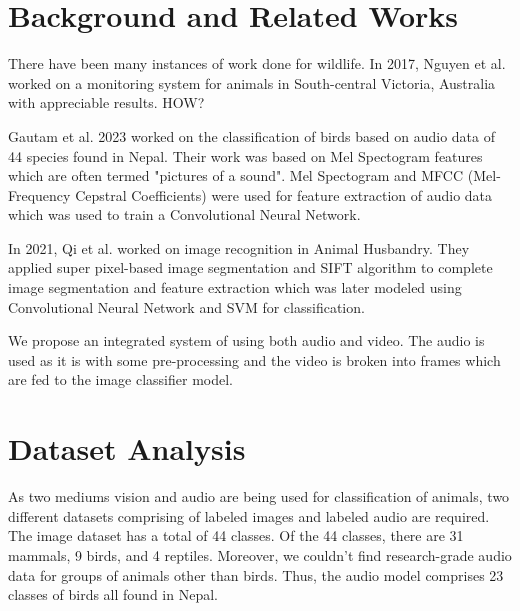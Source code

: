 \documentclass[fleqn, 10pt, twoside]{IOEGC}
\begin{document}
\section{Background and Related Works}
There have been many instances of work done for wildlife. In 2017, Nguyen et al.\cite{r4} worked on a monitoring system for animals in South-central Victoria, Australia with appreciable results. HOW?
\par
Gautam et al. 2023 \cite{r5} worked on the classification of birds based on audio data of 44 species found in Nepal. Their work was based on Mel Spectogram features which are often termed "pictures of a sound". Mel Spectogram and MFCC (Mel-Frequency Cepstral Coefficients) were used for feature extraction of audio data which was used to train a Convolutional Neural Network.
\par
In 2021, Qi et al. \cite{r6} worked on image recognition in Animal Husbandry. They applied super pixel-based image segmentation and SIFT algorithm to complete image segmentation and feature extraction which was later modeled using Convolutional Neural Network and SVM for classification.
\par
We propose an integrated system of using both audio and video. The audio is used as it is with some pre-processing and the video is broken into frames which are fed to the image classifier model.

\section{Dataset Analysis}
As two mediums vision and audio are being used for classification of animals, two different datasets comprising of labeled images and labeled audio are required.
The image dataset has a total of 44 classes. Of the 44 classes, there are 31 mammals, 9 birds, and 4 reptiles. Moreover, we couldn’t find research-grade audio data for groups of animals other than birds. Thus, the audio model comprises 23 classes of birds all found in Nepal.
\end{document}
